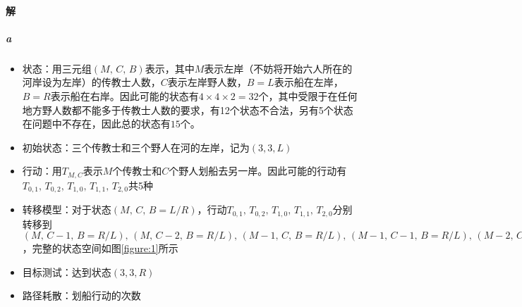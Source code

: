 \documentclass{article}
\begin{document}
\paragraph{解}
\subparagraph{a}
\begin{itemize}
    \item 状态：用三元组$(M,\,C,\,B)$表示，其中$M$表示左岸（不妨将开始六人所在的河岸设为左岸）的传教士人数，$C$表示左岸野人数，$B = L$表示船在左岸，$B = R$表示船在右岸。因此可能的状态有$4 \times 4 \times 2 = 32$个，其中受限于在任何地方野人数都不能多于传教士人数的要求，有12个状态不合法，另有5个状态在问题中不存在，因此总的状态有$15$个。
    \item 初始状态：三个传教士和三个野人在河的左岸，记为$(3, 3, L)$
    \item 行动：用$T_{M,C}$表示$M$个传教士和$C$个野人划船去另一岸。因此可能的行动有$T_{0,1},\,T_{0,2},\,T_{1,0},\,T_{1,1},\,T_{2,0}$共5种
    \item 转移模型：对于状态$(M,\,C,\,B = L/R)$，行动$T_{0,1},\,T_{0,2},\,T_{1,0},\,T_{1,1},\,T_{2,0}$分别转移到$(M,\,C - 1,\,B = R/L),\,(M,\,C - 2,\,B = R/L),\,(M - 1,\,C,\,B = R/L),\,(M - 1,\,C - 1,\,B = R/L),\,(M - 2,\,C,\,B = R/L)$，完整的状态空间如图\ref{figure:1}所示
    \item 目标测试：达到状态$(3, 3, R)$
    \item 路径耗散：划船行动的次数
\end{itemize}
\end{document}
